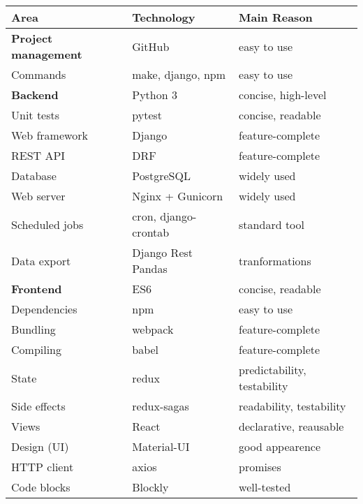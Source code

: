 \begin{center}
\begin{tabular}{l l l}
\toprule
Area & Technology & Main Reason  \\
\midrule
\textbf{Project management} & GitHub & easy to use \\  %
Commands & make, django, npm & easy to use \\
\hline
\textbf{Backend} & Python 3 & concise, high-level \\
Unit tests & pytest & concise, readable \\
Web framework & Django & feature-complete \\ %
REST API & DRF & feature-complete \\ %
Database & PostgreSQL & widely used \\
Web server & Nginx + Gunicorn & widely used \\
Scheduled jobs & cron, django-crontab & standard tool \\
Data export & Django Rest Pandas & tranformations \\ %
\hline
\textbf{Frontend} & ES6 & concise, readable \\
Dependencies & npm & easy to use \\
Bundling & webpack & feature-complete \\ %
Compiling & babel & feature-complete \\ %
State & redux  & predictability, testability \\  %
Side effects & redux-sagas  & readability, testability \\
Views & React & declarative, reausable \\
Design (UI) & Material-UI & good appearence \\
HTTP client & axios & promises \\
Code blocks & Blockly & well-tested \\

\end{tabular}
\end{center}
